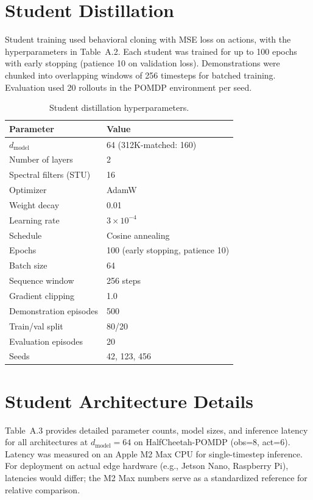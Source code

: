 \section{Student Distillation}

Student training used behavioral cloning with MSE loss on actions, with the hyperparameters in Table~A.2.
Each student was trained for up to 100 epochs with early stopping (patience 10 on validation loss).
Demonstrations were chunked into overlapping windows of 256 timesteps for batched training.
Evaluation used 20 rollouts in the POMDP environment per seed.

\begin{table}[ht]
\centering
\caption{Student distillation hyperparameters.}
\begin{tabular}{ll}
\toprule
Parameter & Value \\
\midrule
$d_\text{model}$ & 64 (312K-matched: 160) \\
Number of layers & 2 \\
Spectral filters (STU) & 16 \\
Optimizer & AdamW \\
Weight decay & 0.01 \\
Learning rate & $3 \times 10^{-4}$ \\
Schedule & Cosine annealing \\
Epochs & 100 (early stopping, patience 10) \\
Batch size & 64 \\
Sequence window & 256 steps \\
Gradient clipping & 1.0 \\
Demonstration episodes & 500 \\
Train/val split & 80/20 \\
Evaluation episodes & 20 \\
Seeds & 42, 123, 456 \\
\bottomrule
\end{tabular}
\end{table}

\section{Student Architecture Details}

Table~A.3 provides detailed parameter counts, model sizes, and inference latency for all architectures at $d_\text{model}=64$ on HalfCheetah-POMDP (obs=8, act=6).
Latency was measured on an Apple M2 Max CPU for single-timestep inference.
For deployment on actual edge hardware (e.g., Jetson Nano, Raspberry Pi), latencies would differ; the M2 Max numbers serve as a standardized reference for relative comparison.

